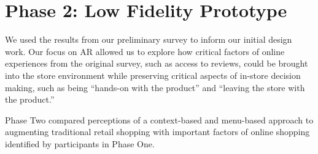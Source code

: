 \section{Phase 2: Low Fidelity Prototype}
We used the results from our preliminary survey to inform our initial design work. Our focus on AR allowed us to explore how critical factors of online experiences from the original survey, such as access to reviews, could be brought into the store environment while preserving critical aspects of in-store decision making, such as being ``hands-on with the product'' and ``leaving the store with the product.'' 

\begin{marginfigure}
	\begin{minipage}{\marginparwidth}
			\centering
			\vfill
		\caption{Phase Two compared perceptions of a context-based and menu-based approach to augmenting traditional retail shopping with important factors of online shopping identified by participants in Phase One. }
	\end{minipage}
\end{marginfigure}

